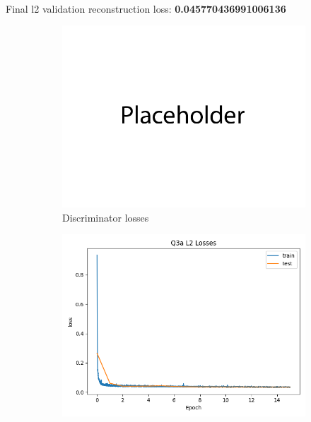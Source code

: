 \documentclass{article}
\begin{document}
\newpage
{}\\

Final l2 validation reconstruction loss: \textbf{0.045770436991006136} \\
\begin{figure}[H]
    \centering
    \begin{subfigure}{0.45\textwidth}
        \centering
        \includegraphics[width=\textwidth]{figures/q3a_gan_losses.png}
        \caption{Discriminator losses}
    \end{subfigure}
    \begin{subfigure}{0.45\textwidth}
        \centering
        \includegraphics[width=\textwidth]{figures/q3a_l2_losses.png}

\end{subfigure}
\end{figure}
\end{document}
